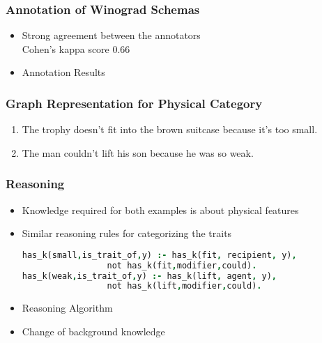 \documentclass[c,8pt,xcolor...,x11names]{beamer}
\begin{document}
\begin{frame}[fragile]
\frametitle{Annotation of Winograd Schemas}
	\begin{itemize}
	\normalsize
	\item Strong agreement between the annotators \\
	Cohen's kappa score 0.66
	\item Annotation Results \\
\end{itemize}
\begin{table}
	\centering
	
\end{table}	
\end{frame}

\begin{frame}[fragile]

\frametitle{Graph Representation for Physical Category}
 \begin{enumerate}	
	\item The trophy doesn't fit into the brown suitcase because it's too small. 
	


 \item The man couldn't lift his son because he was so weak. 
 			 

\end{enumerate}
\end{frame}


\begin{frame}[fragile] \frametitle{Reasoning}

	\begin{itemize}
	\item Knowledge required for both examples is about \alert{physical features} 
	\item Similar reasoning rules for categorizing the traits
	
\begin{lstlisting}[language = Prolog]
has_k(small,is_trait_of,y) :- has_k(fit, recipient, y), 
			     not has_k(fit,modifier,could).	
has_k(weak,is_trait_of,y) :- has_k(lift, agent, y), 
			     not has_k(lift,modifier,could).		
\end{lstlisting}

			\item Reasoning Algorithm
	\onslide<2->		\item Change of background knowledge
 
	
\end{itemize}
\end{frame}
\end{document}
